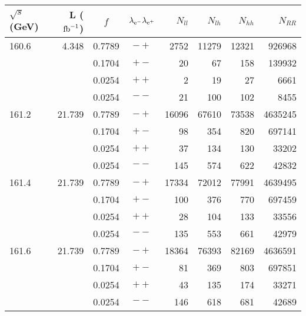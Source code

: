 \documentclass[12pt]{article}
\begin{document}
\begin{table}[!htb]
\begin{center}
\begin{tabular}{l|r|c|c|r|r|r|r}
    $\sqrt{s}$ (GeV) &   L ($\rm{fb}^{-1}$)   &  $f$  & $\lambda_{\rm{e}^{-}} \lambda_{\rm{e}^{+}} $   &   $N_{ll}$ & $N_{lh}$   & $N_{hh}$ & $N_
{RR}$ \\ \hline 
     160.6 &      4.348 &     0.7789  & $-+$   &    2752  &   11279  &   12321  &  926968 \\ 
           &            &     0.1704  & $+-$   &      20  &      67  &     158  &  139932 \\ 
           &            &     0.0254  & $++$   &       2  &      19  &      27  &    6661 \\ 
           &            &     0.0254  & $--$   &      21  &     100  &     102  &    8455 \\ \hline

     161.2 &     21.739 &     0.7789  & $-+$   &   16096  &   67610  &   73538  & 4635245 \\ 
           &            &     0.1704  & $+-$   &      98  &     354  &     820  &  697141 \\ 
           &            &     0.0254  & $++$   &      37  &     134  &     130  &   33202 \\ 
           &            &     0.0254  & $--$   &     145  &     574  &     622  &   42832 \\ \hline

     161.4 &     21.739 &     0.7789  & $-+$   &   17334  &   72012  &   77991  & 4639495 \\ 
           &            &     0.1704  & $+-$   &     100  &     376  &     770  &  697459 \\ 
           &            &     0.0254  & $++$   &      28  &     104  &     133  &   33556 \\ 
           &            &     0.0254  & $--$   &     135  &     553  &     661  &   42979 \\ \hline

     161.6 &     21.739 &     0.7789  & $-+$   &   18364  &   76393  &   82169  & 4636591 \\ 
           &            &     0.1704  & $+-$   &      81  &     369  &     803  &  697851 \\ 
           &            &     0.0254  & $++$   &      43  &     135  &     174  &   33271 \\ 
           &            &     0.0254  & $--$   &     146  &     618  &     681  &   42689 \\ \hline


\end{tabular}
\end{center}
\end{table}
\end{document}
